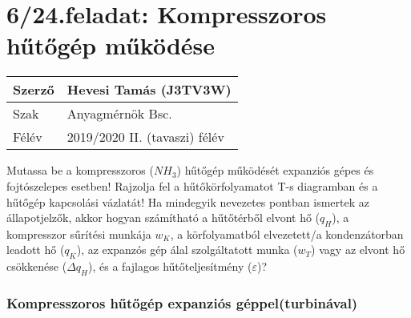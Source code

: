 \section*{6/24.feladat: Kompresszoros hűtőgép működése}


\begin{tabular}{ | p{2cm} | p{14cm} | } 
	\hline
	Szerző & Hevesi Tamás (J3TV3W) \\ 
	\hline
	Szak & Anyagmérnök Bsc. \\ 
	\hline
	Félév & 2019/2020 II. (tavaszi) félév \\ 
	\hline
\end{tabular}
\vspace{0.5cm}

\noindent Mutassa be a kompresszoros ($NH_3$) hűtőgép működését expanziós gépes és fojtószelepes esetben! Rajzolja fel a hűtőkörfolyamatot T-s diagramban és a hűtőgép kapcsolási vázlatát! Ha mindegyik nevezetes pontban ismertek az állapotjelzők, akkor hogyan számítható a hűtőtérből elvont hő ($q_H$), a kompresszor sűrítési munkája $w_K$, a körfolyamatból elvezetett/a kondenzátorban leadott hő ($q_K$), az expanzós gép álal szolgáltatott munka ($w_T$) vagy az elvont hő csökkenése ($Δq_H$), és a fajlagos hűtőteljesítmény ($\varepsilon$)?

\subsubsection{Kompresszoros hűtőgép expanziós géppel(turbinával)}

